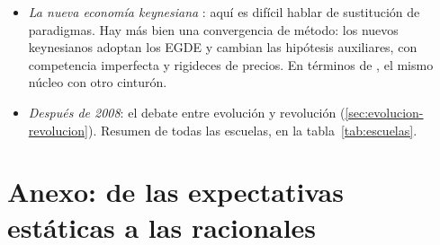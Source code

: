 \documentclass[11pt]{article}
\begin{document}
\begin{itemize}
\begin{itemize}
  \item \emph{los modelos de equilibrio general dinámicos y estocásticos} (EGDE): agentes que optimizan a lo largo del tiempo ante perturbaciones aleatorias, en equilibrio general\nocite{KydlandPrescott1982Time}.\footnote{Resolverlos fue posible en buena parte por los avances de las matemáticas y del cálculo: la programación dinámica y los métodos numéricos. El equilibrio ya no es una asignación estática, sino una senda completa de valores a lo largo del tiempo.} En el modelo de ciclo real básico, hogares que eligen consumo, trabajo y ahorro, empresas competitivas con una función de producción agregada y ningún sector público: sin fallos de mercado, los ciclos son la respuesta óptima a las perturbaciones y estabilizarlos sería ineficiente. Los agentes forman sus expectativas de forma racional (anexo~\ref{anexo:expectativas}).
  \end{itemize}
  \begin{itemize}
  \item «Lo que voy a describir es una revolución en la macroeconomía, una transformación metodológica que ha cambiado la forma de hacer nuestra ciencia»: así empezó  su conferencia Nobel, el 8~de diciembre de 2004\nocite{Prescott2006Nobel}. El programa lo reconocen los premios Nobel a  (1995),  y  (2004) y  (2011)\nocite{NobelPrize1995Lucas,Nobel2004KydlandPrescott,Nobel2011SargentSims}, y su instrumental se ha llevado a la macroeconomía abierta  y a la economía del clima .
  \end{itemize}
\item \emph{La nueva economía keynesiana} : aquí es difícil hablar de sustitución de paradigmas. Hay más bien una convergencia de método: los nuevos keynesianos adoptan los EGDE y cambian las hipótesis auxiliares, con competencia imperfecta y rigideces de precios. En términos de , el mismo núcleo con otro cinturón.
\item \emph{Después de 2008}: el debate entre evolución y revolución (\ref{sec:evolucion-revolucion}). Resumen de todas las escuelas, en la tabla~\ref{tab:escuelas}.
\end{itemize}

\section{Anexo: de las expectativas estáticas a las racionales}\label{anexo:expectativas}
\end{document}
